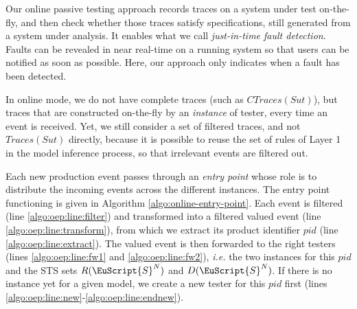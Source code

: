 Our online passive testing approach records traces on a system
under test on-the-fly, and then check whether those traces
satisfy specifications, still generated from a system under
analysis. It enables what we call \emph{just-in-time fault
detection}. Faults can be revealed in near real-time on a running
system so that users can be notified as soon as possible. Here,
our approach only indicates when a fault has been detected.

In online mode, we do not have complete traces (such as
$CTraces({Sut})$), but traces that are constructed on-the-fly by
an \emph{instance} of tester, every time an event is received.
Yet, we still consider a set of filtered traces, and not
$Traces(Sut)$ directly, because it is possible to reuse the set
of rules of Layer 1 in the model inference process, so that
irrelevant events are filtered out.

Each new production event passes through an \emph{entry point}
whose role is to distribute the incoming events across the
different instances. The entry point functioning is given in
Algorithm \ref{algo:online-entry-point}. Each event is filtered
(line \ref{algo:oep:line:filter})
and transformed into a filtered valued event (line
\ref{algo:oep:line:transform}), from which we extract its product
identifier $pid$ (line \ref{algo:oep:line:extract}).  The valued
event is then forwarded to the right testers (lines
\ref{algo:oep:line:fw1} and \ref{algo:oep:line:fw2}), \emph{i.e.}
the two instances for this $pid$ and the STS sets
$R(\EuScript{S}^N)$ and $D(\EuScript{S}^N)$.  If there is no
instance yet for a given model, we create a new tester for this
$pid$ first (lines
\ref{algo:oep:line:new}-\ref{algo:oep:line:endnew}).

